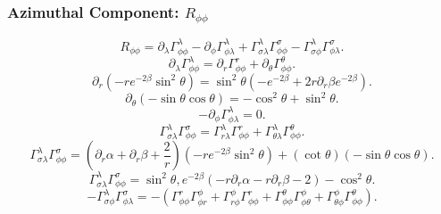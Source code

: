 \documentclass[11pt, a4paper]{report}
\begin{document}
\subsubsection{Azimuthal Component: $R_{\phi\phi}$}
\begin{equation}
R_{\phi\phi} = \partial_\lambda \Gamma^\lambda_{\phi\phi} - \partial_\phi \Gamma^\lambda_{\phi\lambda} + \Gamma^\lambda_{\sigma\lambda} \Gamma^\sigma_{\phi\phi} - \Gamma^\lambda_{\sigma\phi} \Gamma^\sigma_{\phi\lambda}.
\end{equation}
\begin{equation}
\partial_\lambda \Gamma^\lambda_{\phi\phi} = \partial_r \Gamma^r_{\phi\phi} + \partial_\theta \Gamma^\theta_{\phi\phi}.
\end{equation}
\begin{equation}
\partial_r \left( -re^{-2\beta}\sin^2\theta \right) = \sin^2\theta \left( -e^{-2\beta} + 2r\partial_r\beta e^{-2\beta} \right).
\end{equation}
\begin{equation}
\partial_\theta \left( -\sin\theta\cos\theta \right) = -\cos^2\theta + \sin^2\theta.
\end{equation}
\begin{equation}
-\partial_\phi \Gamma^\lambda_{\phi\lambda} = 0.
\end{equation}
\begin{equation}
\Gamma^\lambda_{\sigma\lambda} \Gamma^\sigma_{\phi\phi} = \Gamma^\lambda_{r\lambda} \Gamma^r_{\phi\phi} + \Gamma^\lambda_{\theta\lambda} \Gamma^\theta_{\phi\phi}.
\end{equation}
\begin{equation}
\Gamma^\lambda_{\sigma\lambda} \Gamma^\sigma_{\phi\phi} = \left( \partial_r\alpha + \partial_r\beta + \frac{2}{r} \right) \left( -re^{-2\beta}\sin^2\theta \right) + (\cot\theta) \left( -\sin\theta\cos\theta \right).
\end{equation}
\begin{equation}
\Gamma^\lambda_{\sigma\lambda} \Gamma^\sigma_{\phi\phi} = \sin^2\theta , e^{-2\beta} \left( -r\partial_r\alpha - r\partial_r\beta - 2 \right) - \cos^2\theta.
\end{equation}
\begin{equation}
-\Gamma^\lambda_{\sigma\phi} \Gamma^\sigma_{\phi\lambda} = -\left( \Gamma^r_{\phi\phi} \Gamma^\phi_{\phi r} + \Gamma^\phi_{r\phi} \Gamma^r_{\phi\phi} + \Gamma^\theta_{\phi\phi} \Gamma^\phi_{\phi\theta} + \Gamma^\phi_{\theta\phi} \Gamma^\theta_{\phi\phi} \right).
\end{equation}
\end{document}
